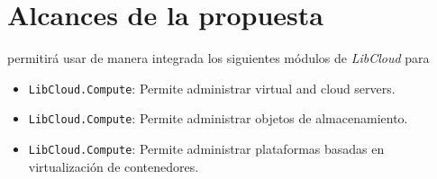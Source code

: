 \chapter{Alcances de la propuesta} %

\label{ch:alcances} %

\appName permitirá usar de manera integrada los siguientes módulos de  \textit{LibCloud} para \:
\begin{itemize}
    \item \texttt{LibCloud.Compute}: Permite administrar virtual and cloud servers.
    \item \texttt{LibCloud.Compute}: Permite administrar objetos de almacenamiento.
    \item \texttt{LibCloud.Compute}: Permite administrar plataformas basadas en virtualización de contenedores.
\end{itemize}